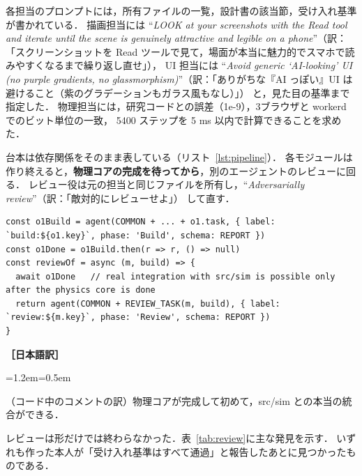 \documentclass[a4paper,10pt]{ltjsarticle}
\newcommand{\tabref}[1]{表~\ref{#1}}
\newcommand{\lstref}[1]{リスト~\ref{#1}}
\newenvironment{yaku}{\par\vspace{-2pt}\small\noindent\textbf{［日本語訳］}\par\nopagebreak\begin{list}{}{\leftmargin=1.2em\rightmargin=0.5em\topsep=1pt}\item\relax}{\end{list}\vspace{4pt}}
\begin{document}
各担当のプロンプトには，所有ファイルの一覧，設計書の該当節，受け入れ基準が書かれている．
描画担当には ``\textit{LOOK at your screenshots with the Read tool and iterate until the scene is genuinely attractive and legible on a phone}''（訳：「スクリーンショットを Read ツールで見て，場面が本当に魅力的でスマホで読みやすくなるまで繰り返し直せ」），
UI 担当には ``\textit{Avoid generic `AI-looking' UI (no purple gradients, no glassmorphism)}''（訳：「ありがちな『AI っぽい』UI は避けること（紫のグラデーションもガラス風もなし）」） と，見た目の基準まで指定した．
物理担当には，研究コードとの誤差（1e-9），3ブラウザと workerd でのビット単位の一致，
5400 ステップを 5 ms 以内で計算できることを求めた．

台本は依存関係をそのまま表している（\lstref{lst:pipeline}）．
各モジュールは作り終えると，\textbf{物理コアの完成を待ってから}，別のエージェントのレビューに回る．
レビュー役は元の担当と同じファイルを所有し，``\textit{Adversarially review}''（訳：「敵対的にレビューせよ」） して直す．

\begin{lstlisting}[caption={作る→レビューする，の依存つきパイプライン（台本の抜粋）},label={lst:pipeline}]
const o1Build = agent(COMMON + ... + o1.task, { label: `build:${o1.key}`, phase: 'Build', schema: REPORT })
const o1Done = o1Build.then(r => r, () => null)
const reviewOf = async (m, build) => {
  await o1Done   // real integration with src/sim is possible only after the physics core is done
  return agent(COMMON + REVIEW_TASK(m, build), { label: `review:${m.key}`, phase: 'Review', schema: REPORT })
}
\end{lstlisting}
\begin{yaku}
（コード中のコメントの訳）物理コアが完成して初めて，src/sim との本当の統合ができる．
\end{yaku}

レビューは形だけでは終わらなかった．\tabref{tab:review}に主な発見を示す．
いずれも作った本人が「受け入れ基準はすべて通過」と報告したあとに見つかったものである．
\end{document}
